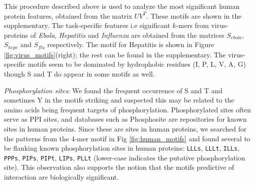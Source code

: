 \documentclass[a4paper,11pt]{article}
\begin{document}
This procedure described above is used to analyze the most significant human protein features, obtained from
the matrix $U V^T$. These motifs are shown in the supplementary. The task-specific features i.e significant $k$-mers from virus-proteins of \textit{Ebola}, \textit{Hepatitis} and \textit{Influenza} are obtained from the matrices $S_{ebola}$, $S_{hepc}$ and $S_{flu}$ respectively. The motif for Hepatitis is shown in Figure \ref{fig:virus_motifs}(right); the rest can be found in the supplementary. %
The virus-specific motifs seem to be dominated by hydrophobic residues (I, P, L, V, A, G) though S and T do appear in some motifs as well.




 \noindent\emph{Phosphorylation sites}: 
 We found the frequent occurrence of S and T and sometimes Y in the motifs striking and suspected this may be
 related to the amino acids being frequent targets of phosphorylation.
 Phosphorylated sites often serve as PPI sites, and databases such as Phosphosite are
  repositories for known sites in human proteins. Since these are sites in human proteins, we searched for the patterns
	from the 4-mer motif in Fig \ref{fig:human_motifs} and found several to be flanking known phosphorylation sites in human proteins:
	\texttt{LLLs}, \texttt{LLLt}, \texttt{ILLs}, \texttt{PPPs}, \texttt{PIPs}, \texttt{PIPt}, \texttt{LIPs}, \texttt{PLLt} (lower-case indicates the putative phosphorylation site). This observation also supports the notion that the motifs predictive
	of interaction are biologically significant.
\end{document}
